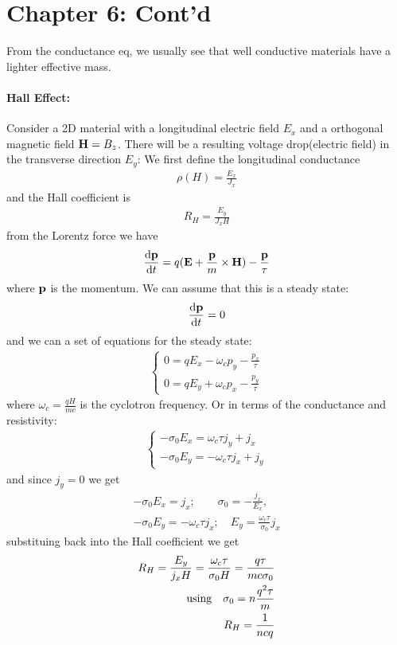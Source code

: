 \documentclass[../main.tex]{subfiles}
\begin{document}
\newpage
{}

\section*{Chapter 6: Cont'd}
From the conductance eq, we usually see that well conductive materials have a lighter effective
mass. 

\paragraph*{Hall Effect:} Consider a 2D material with a longitudinal electric field $E_x$ and a
orthogonal magnetic field $\vb{H} = B_z$. There will be a resulting voltage drop(electric field) in
the transverse direction $E_y$: We first define the longitudinal conductance
\begin{align*}
    \rho(H) = \frac{E_x}{J_x}
\end{align*}
and the Hall coefficient is
\begin{align*}
    R_H = \frac{E_y}{J_x H}
\end{align*}
from the Lorentz force we have
\begin{align*}
    \dv{\vb p}{t} = q(\vb E + \frac{\vb p}{m} \times \vb H) - \frac{\vb p}{\tau}
\end{align*}
where $\vb p$ is the momentum. We can assume that this is a steady state:
\begin{align*}
    \dv{\vb p}{t} = 0
\end{align*}
and we can a set of equations for the steady state:
\begin{align*}
    \begin{cases}
        0 = qE_x - \omega_c p_y - \frac{p_x}{\tau} \\
        0 = qE_y + \omega_c p_x - \frac{p_y}{\tau}
    \end{cases}
\end{align*}
where $\omega_c = \frac{qH}{mc}$ is the cyclotron frequency. Or in terms of the conductance and 
resistivity:
\begin{align*}
    \begin{cases}
        -\sigma_0 E_x = \omega_c \tau j_y + j_x \\
        -\sigma_0 E_y = -\omega_c \tau j_x + j_y
    \end{cases}
\end{align*}
and since $j_y = 0$ we get
\begin{align*}
    -\sigma_0 E_x = j_x; \qquad \sigma_0 = -\frac{j_x}{E_x}, \\
    -\sigma_0 E_y = -\omega_c \tau j_x; \quad E_y = \frac{\omega_c \tau}{\sigma_0} j_x
\end{align*}
substituing back into the Hall coefficient we get
\begin{align*}
    R_H = \frac{E_y}{j_x H} = \frac{\omega_c \tau}{\sigma_0 H} = \frac{q \tau}{m c \sigma_0}  \\
    \qusing \sigma_0 = n \frac{q^2 \tau}{m} \\
    R_H = \frac{1}{ncq}
\end{align*}
\end{document}

